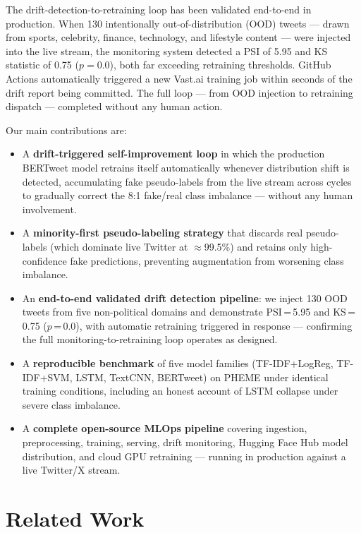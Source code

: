 \documentclass[sigconf]{acmart}
\begin{document}
The drift-detection-to-retraining loop has been validated end-to-end in production. When
130 intentionally out-of-distribution (OOD) tweets — drawn from sports, celebrity, finance,
technology, and lifestyle content — were injected into the live stream, the monitoring
system detected a PSI of 5.95 and KS statistic of 0.75 ($p = 0.0$), both far exceeding
retraining thresholds. GitHub Actions automatically triggered a new Vast.ai training job
within seconds of the drift report being committed. The full loop — from OOD injection to
retraining dispatch — completed without any human action.

Our main contributions are:
\begin{itemize}
  \item A \textbf{drift-triggered self-improvement loop} in which the production BERTweet
        model retrains itself automatically whenever distribution shift is detected, accumulating
        fake pseudo-labels from the live stream across cycles to gradually correct the 8:1
        fake/real class imbalance — without any human involvement.
  \item A \textbf{minority-first pseudo-labeling strategy} that discards real pseudo-labels
        (which dominate live Twitter at $\approx$99.5\%) and retains only high-confidence
        fake predictions, preventing augmentation from worsening class imbalance.
  \item An \textbf{end-to-end validated drift detection pipeline}: we inject 130 OOD tweets
        from five non-political domains and demonstrate PSI\,=\,5.95 and KS\,=\,0.75
        ($p$\,=\,0.0), with automatic retraining triggered in response — confirming the
        full monitoring-to-retraining loop operates as designed.
  \item A \textbf{reproducible benchmark} of five model families (TF-IDF+LogReg, TF-IDF+SVM,
        LSTM, TextCNN, BERTweet) on PHEME under identical training conditions, including an
        honest account of LSTM collapse under severe class imbalance.
  \item A \textbf{complete open-source MLOps pipeline} covering ingestion, preprocessing,
        training, serving, drift monitoring, Hugging Face Hub model distribution, and
        cloud GPU retraining — running in production against a live Twitter/X stream.
\end{itemize}


\section{Related Work}
\end{document}
